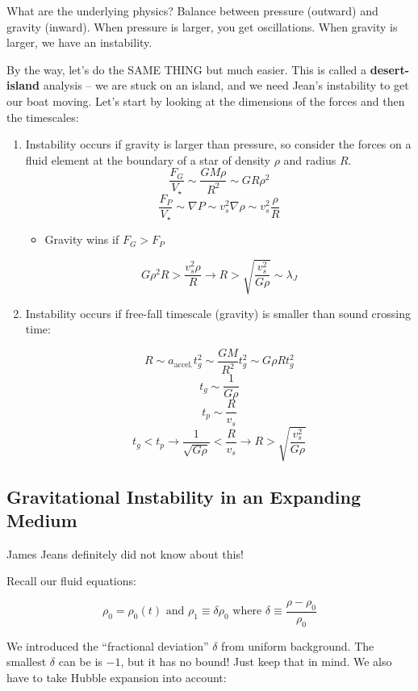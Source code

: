 \documentclass{article}
\newcommand{\be}{\begin{equation}}
\newcommand{\ee}{\end{equation}}
\begin{document}
What are the underlying physics? Balance between pressure (outward) and gravity (inward). When pressure is larger, you get oscillations. When gravity is larger, we have an instability. 

By the way, let's do the SAME THING but much easier. This is called a \textbf{desert-island} analysis -- we are stuck on an island, and we need Jean's instability to get our boat moving. Let's start by looking at the dimensions of the forces and then the timescales:

\begin{enumerate}
    \item Instability occurs if gravity is larger than pressure, so consider the forces on a fluid element at the boundary of a star of density $\rho$ and radius $R$.
    \be
    \frac{F_G}{V_\star} \sim \frac{GM\rho}{R^2} \sim G R \rho^2
    \ee
    \be
    \frac{F_P}{V_\star} \sim \nabla P \sim v_s^2 \nabla \rho \sim v_s^2 \frac{\rho}{R}
    \ee
    \begin{itemize}
        \item Gravity wins if $F_G > F_P$
    \end{itemize}
    \be
    G \rho^2 R > \frac{v_s^2 \rho}{R} \rightarrow \boxed{R > \sqrt{\frac{v_s^2}{G \rho}} \sim \lambda_J}
    \ee
    
    \item Instability occurs if free-fall timescale (gravity) is smaller than sound crossing time:
    
    \be
    R \sim a_\text{accel.}t_g^2 \sim \frac{GM}{R^2} t_g^2 \sim G \rho R t^2_g
    \ee
    \be
    \boxed{t_g \sim \frac{1}{G\rho}}
    \ee
    \be
    t_p \sim \frac{R}{v_s}
    \ee
    \be
    t_g < t_p \rightarrow \frac{1}{\sqrt{G\rho}} < \frac{R}{v_s} \rightarrow R > \sqrt{\frac{v_s^2}{G\rho}}
    \ee
\end{enumerate}


\subsection{Gravitational Instability in an Expanding Medium}

James Jeans definitely did not know about this! 

Recall our fluid equations:

\be
\rho_0 = \rho_0(t) \text{ and } \rho_1 \equiv \delta \rho_0 \text{ where } \delta \equiv \frac{\rho - \rho_0}{\rho_0}
\ee

We introduced the ``fractional deviation'' $\delta$ from uniform background. The smallest $\delta$ can be is $-1$, but it has no bound! Just keep that in mind. We also have to take Hubble expansion into account:
\end{document}
